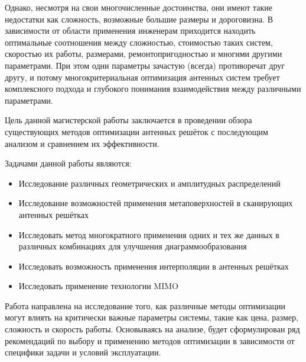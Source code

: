 Однако, несмотря на свои многочисленные достоинства, они имеют такие недостатки как сложность, возможные
большие размеры и дороговизна. В зависимости от области применения инженерам приходится находить оптимальные
соотношения между сложностью, стоимостью таких систем, скоростью их работы, размерами, ремонтопригодностью и
многими другими параметрами. При этом одни параметры зачастую (всегда) противоречат друг другу, и потому
многокритериальная оптимизация антенных систем требует комплексного подхода и глубокого понимания взаимодействия
между различными параметрами.

Цель данной магистерской работы заключается в проведении обзора существующих методов оптимизации антенных решёток
с последующим анализом и сравнением их эффективности.

Задачами данной работы являются:

\begin{itemize}
    \item Исследование различных геометрических и амплитудных распределений
    \item Исследование возможностей применения метаповерхностей в сканирующих антенных решётках
    \item Исследовать метод многократного применения одних и тех же данных в различных комбинациях для
    улучшения диаграммообразования
    \item Исследовать возможность применения интерполяции в антенных решётках
    \item Исследовать применение технологии MIMO
\end{itemize}

Работа направлена на исследование того, как различные методы оптимизации могут влиять на критически важные параметры
системы, такие как цена, размер, сложность и скорость работы. Основываясь на анализе, будет сформулирован ряд
рекомендаций по выбору и применению методов оптимизации в зависимости от специфики задачи и условий эксплуатации.
